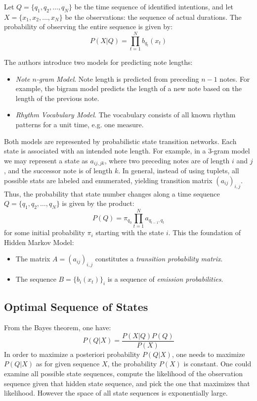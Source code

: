 Let $Q = \{q_1,q_2,\ldots, q_N\}$ be the time sequence of identified intentions, and let $X=\{x_1,x_2,\ldots,x_N\}$ be the observations: the sequence of actual durations. The probability of observing the entire sequence is given by: $$P(X|Q)=\prod_{t=1}^N b_{q_t}(x_t)$$ 

The authors introduce two models for predicting note lengths: \begin{itemize}
	\item \emph{Note $n$-gram Model}. Note length is predicted from preceding $n - 1$ notes. For example, the bigram model predicts the length of a new note based on the length of the previous note.
	\item \emph{Rhythm Vocabulary Model}. The vocabulary consists of all known rhythm patterns for a unit time, e.g. one measure.\end{itemize}
	
Both models are represented by probabilistic state transition networks. Each state is associated with an intended note length. For example, in a $3$-gram model we may represent a state as $a_{ij,jk}$, where two preceding notes are of length $i$ and $j$, and the successor note is of length $k$. In general, instead of using tuplets, all possible stats are labeled and enumerated, yielding transition matrix $(a_{ij})_{i,j}$. Thus, the probability that state number changes along a time sequence $Q=\{q_1,q_2,\ldots,q_N\}$ is given by the product: $$P(Q)=\pi_{q_0}\prod_{t=1}^N a_{q_{t-1},q_t}$$ for some initial probability $\pi_i$ starting with the state $i$. This the foundation of Hidden Markov Model: \begin{itemize}
	\item The matrix $A=(a_{ij})_{i,j}$ constitutes a \emph{transition probability matrix}.
	\item The sequence $B=\{b_i(x_t)\}_{i}$ is a sequence of \emph{emission probabilities}.
\end{itemize}

\subsection{Optimal Sequence of States}

From the Bayes theorem, one have: $$P(Q|X)=\frac{P(X|Q)P(Q)}{P(X)}$$ In order to maximize a posteriori probability $P(Q|X)$, one needs to maximize $P(Q|X)$ as for given sequence $X$, the probability $P(X)$ is constant. One could examine all possible state sequences, compute the likelihood of the observation sequence given that hidden state sequence, and pick the one that maximizes that likelihood. However the space of all state sequences is exponentially large.

